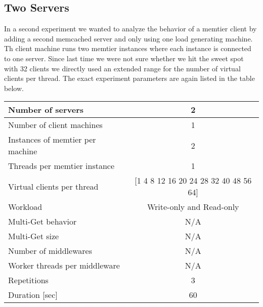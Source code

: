\documentclass[11pt,a4paper]{article}
\begin{document}
\subsection{Two Servers}

In a second experiment we wanted to analyze the behavior of a memtier client by adding a second memcached server and only using one load generating machine. Th client machine runs two memtier instances where each instance is connected to one server. Since last time we were not sure whether we hit the sweet spot with 32 clients we directly used an extended range for the number of virtual clients per thread. The exact experiment parameters are again listed in the table below.


\begin{center}
	\scriptsize{
		\begin{tabular}{|l|c|}
			\hline Number of servers                & 2                        \\ 
			\hline Number of client machines        & 1                        \\ 
			\hline Instances of memtier per machine & 2                        \\ 
			\hline Threads per memtier instance     & 1                        \\
			\hline Virtual clients per thread       & [1 4 8 12 16 20 24 28 32 40 48 56 64]                  \\ 
			\hline Workload                         & Write-only and Read-only \\
			\hline Multi-Get behavior               & N/A                      \\
			\hline Multi-Get size                   & N/A                      \\
			\hline Number of middlewares            & N/A                      \\
			\hline Worker threads per middleware    & N/A                      \\
			\hline Repetitions                      & 3                 \\ 
			\hline Duration [sec]                      & 60              \\ 
			\hline 
		\end{tabular}
	} 
\end{center}
\end{document}
